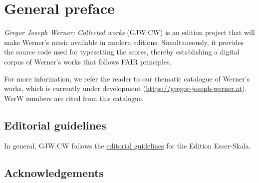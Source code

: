 \documentclass{ees}
\begin{document}

\setcounter{page}{1}

\tableofcontents

\chapter{General preface}

\textit{Gregor Joseph Werner: Collected works} (GJW:CW) is an edition project that will make Werner’s music available in modern editions. Simultaneously, it provides the source code used for typesetting the scores, thereby establishing a digital corpus of Werner’s works that follows FAIR principles.

For more information, we refer the reader to our thematic catalogue of Werner’s works, which is currently under development (\href{https://gregor-joseph-werner.at}{https://gregor-joseph-werner.at}). WerW numbers are cited from this catalogue.


\section{Editorial guidelines}

In general, GJW:CW follows the \href{https://edition.esser-skala.at/about/editorial-guidelines/}{editorial guidelines} for the Edition Esser-Skala.


\section{Acknowledgements}
\end{document}
